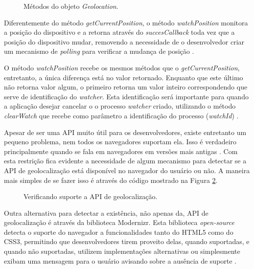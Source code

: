 \documentclass[diss]{template/setrem}
\begin{document}
\begin{figure}[!h]
    \caption{Métodos do objeto \emph{Geolocation}.}
    \label{fig:w3c-geo-pos}
\end{figure}

Diferentemente do método \emph{getCurrentPosition}, o método \emph{watchPosition} monitora a posição do dispositivo e a retorna através do \emph{succesCallback} toda vez que a posição do dispositivo mudar, removendo a necessidade de o desenvolvedor criar um mecanismo de \emph{polling} para verificar a mudança de posição \citep{Holdener2011, Popescu2009}.

O método \emph{watchPosition} recebe os mesmos métodos que o \emph{getCurrentPosition}, entretanto, a única diferença está no valor retornado. Enquanto que este último não retorna valor algum, o primeiro retorna um valor inteiro correspondendo que serve de identificação do \emph{watcher}. Esta identificação será importante para quando a aplicação desejar cancelar o o processo \emph{watcher} criado, utilizando o método \emph{clearWatch} que recebe como parâmetro a identificação do processo (\emph{watchId}) \citep{Popescu2009}.

Apesar de ser uma API muito útil para os desenvolvedores, existe entretanto um pequeno problema, nem todos os navegadores suportam ela. Isso é verdadeiro principalmente quando se fala em navegadores em versões mais antigas \citep{Holdener2011}. Com esta restrição fica evidente a necessidade de algum mecanismo para detectar se a API de geolocalização está disponível no navegador do usuário ou não. A maneira mais simples de se fazer isso é através do código mostrado na Figura \ref{fig:w3c-geo-support}.

\begin{figure}[!h]
    \caption{Verificando suporte a API de geolocalização.}
    \label{fig:w3c-geo-support}
\end{figure}

Outra alternativa para detectar a existência, não apenas da, API de geolocalização é através da biblioteca Modernizr. Esta biblioteca \emph{open-source} detecta o suporte do navegador a funcionalidades tanto do HTML5 como do CSS3, permitindo que desenvolvedores tirem proveito delas, quando suportadas, e quando não suportadas, utilizem implementações alternativas ou simplesmente exibam uma mensagem para o usuário avisando sobre a ausência de suporte \citep{Ates2010}.
\end{document}
